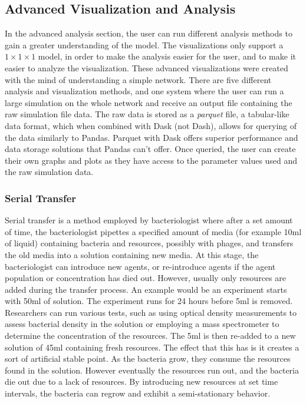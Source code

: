 \subsection{Advanced Visualization and Analysis}
In the advanced analysis section, the user can run different analysis methods to gain a greater understanding of the model.
The visualizations only support a $1 \times 1\times 1$ model, in order to make the analysis easier for the user, and to make it easier to analyze the visualization.
These advanced visualizations were created with the mind of understanding a simple network.
There are five different analysis and visualization methods, and one system where the user can run a large simulation on the whole network and receive an output file containing the raw simulation file data.
The raw data is stored as a \textit{parquet} file, a tabular-like data format, which when combined with Dask (not Dash), allows for querying of the data similarly to Pandas.
Parquet with Dask offers superior performance and data storage solutions that Pandas can't offer.
Once queried, the user can create their own graphs and plots as they have access to the parameter values used and the raw simulation data.

\subsubsection{Serial Transfer}
\label{sec:serial_transfer}
Serial transfer is a method employed by bacteriologist where after a set amount of time, the bacteriologist pipettes a specified amount of media (for example 10ml of liquid) containing bacteria and resources, possibly with phages, and transfers the old media into a solution containing new media.
At this stage, the bacteriologist can introduce new agents, or re-introduce agents if the agent population or concentration has died out.
However, usually only resources are added during the transfer process.
An example would be an experiment starts with 50ml of solution.
The experiment runs for 24 hours before 5ml is removed.
Researchers can run various tests, such as using optical density measurements to assess bacterial density in the solution or employing a mass spectrometer to determine the concentration of the resources.
The 5ml is then re-added to a new solution of 45ml containing fresh resources.
The effect that this has is it creates a sort of artificial stable point.
As the bacteria grow, they consume the resources found in the solution.
However eventually the resources run out, and the bacteria die out due to a lack of resources.
By introducing new resources at set time intervals, the bacteria can regrow and exhibit a semi-stationary behavior.
\newline


